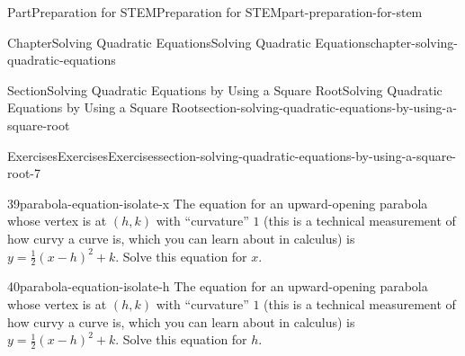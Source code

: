 \documentclass[twoside,10pt,]{book}
\numberwithin{equation}{section}
\begin{document}
\begin{partptx}{Part}{Preparation for STEM}{}{Preparation for STEM}{}{}{part-preparation-for-stem}
\begin{chapterptx}{Chapter}{Solving Quadratic Equations}{}{Solving Quadratic Equations}{}{}{chapter-solving-quadratic-equations}
\begin{sectionptx}{Section}{Solving Quadratic Equations by Using a Square Root}{}{Solving Quadratic Equations by Using a Square Root}{}{}{section-solving-quadratic-equations-by-using-a-square-root}
\begin{exercises-subsection}{Exercises}{Exercises}{}{Exercises}{}{}{section-solving-quadratic-equations-by-using-a-square-root-7}
\begin{exercisegroup}
\begin{divisionexerciseeg}{39}{}{}{parabola-equation-isolate-x}
The equation for an upward-opening parabola whose vertex is at \((h,k)\) with ``curvature'' \(1\) (this is a technical measurement of how curvy a curve is, which you can learn about in calculus) is \(y=\frac{1}{2}(x-h)^2+k\text{.}\) Solve this equation for \(x\text{.}\)%
\end{divisionexerciseeg}%
\begin{divisionexerciseeg}{40}{}{}{parabola-equation-isolate-h}%
The equation for an upward-opening parabola whose vertex is at \((h,k)\) with ``curvature'' \(1\) (this is a technical measurement of how curvy a curve is, which you can learn about in calculus) is \(y=\frac{1}{2}(x-h)^2+k\text{.}\) Solve this equation for \(h\text{.}\)%
\end{divisionexerciseeg}%
\end{exercisegroup}
\par\medskip\noindent

\end{exercises-subsection}
\end{sectionptx}
\end{chapterptx}
\end{partptx}
\end{document}
